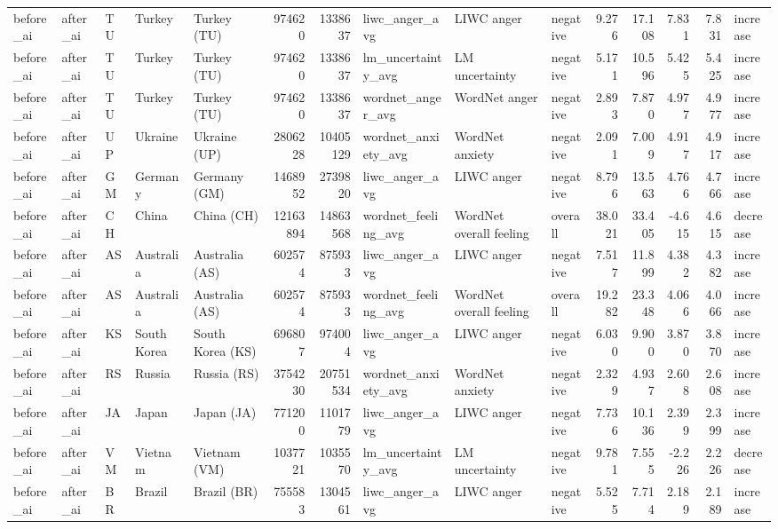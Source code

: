 \begin{tabular}{lllllrrlllrrrrl}
before\_ai & after\_ai & TU & Turkey & Turkey (TU) & 974620 & 1338637 & liwc\_anger\_avg & LIWC anger & negative & 9.276 & 17.108 & 7.831 & 7.831 & increase \\
before\_ai & after\_ai & TU & Turkey & Turkey (TU) & 974620 & 1338637 & lm\_uncertainty\_avg & LM uncertainty & negative & 5.171 & 10.596 & 5.425 & 5.425 & increase \\
before\_ai & after\_ai & TU & Turkey & Turkey (TU) & 974620 & 1338637 & wordnet\_anger\_avg & WordNet anger & negative & 2.893 & 7.870 & 4.977 & 4.977 & increase \\
before\_ai & after\_ai & UP & Ukraine & Ukraine (UP) & 2806228 & 10405129 & wordnet\_anxiety\_avg & WordNet anxiety & negative & 2.091 & 7.009 & 4.917 & 4.917 & increase \\
before\_ai & after\_ai & GM & Germany & Germany (GM) & 1468952 & 2739820 & liwc\_anger\_avg & LIWC anger & negative & 8.796 & 13.563 & 4.766 & 4.766 & increase \\
before\_ai & after\_ai & CH & China & China (CH) & 12163894 & 14863568 & wordnet\_feeling\_avg & WordNet overall feeling & overall & 38.021 & 33.405 & -4.615 & 4.615 & decrease \\
before\_ai & after\_ai & AS & Australia & Australia (AS) & 602574 & 875933 & liwc\_anger\_avg & LIWC anger & negative & 7.517 & 11.899 & 4.382 & 4.382 & increase \\
before\_ai & after\_ai & AS & Australia & Australia (AS) & 602574 & 875933 & wordnet\_feeling\_avg & WordNet overall feeling & overall & 19.282 & 23.348 & 4.066 & 4.066 & increase \\
before\_ai & after\_ai & KS & South Korea & South Korea (KS) & 696807 & 974004 & liwc\_anger\_avg & LIWC anger & negative & 6.030 & 9.900 & 3.870 & 3.870 & increase \\
before\_ai & after\_ai & RS & Russia & Russia (RS) & 3754230 & 20751534 & wordnet\_anxiety\_avg & WordNet anxiety & negative & 2.329 & 4.937 & 2.608 & 2.608 & increase \\
before\_ai & after\_ai & JA & Japan & Japan (JA) & 771200 & 1101779 & liwc\_anger\_avg & LIWC anger & negative & 7.736 & 10.136 & 2.399 & 2.399 & increase \\
before\_ai & after\_ai & VM & Vietnam & Vietnam (VM) & 1037721 & 1035570 & lm\_uncertainty\_avg & LM uncertainty & negative & 9.781 & 7.555 & -2.226 & 2.226 & decrease \\
before\_ai & after\_ai & BR & Brazil & Brazil (BR) & 755583 & 1304561 & liwc\_anger\_avg & LIWC anger & negative & 5.525 & 7.714 & 2.189 & 2.189 & increase \\

\end{tabular}
